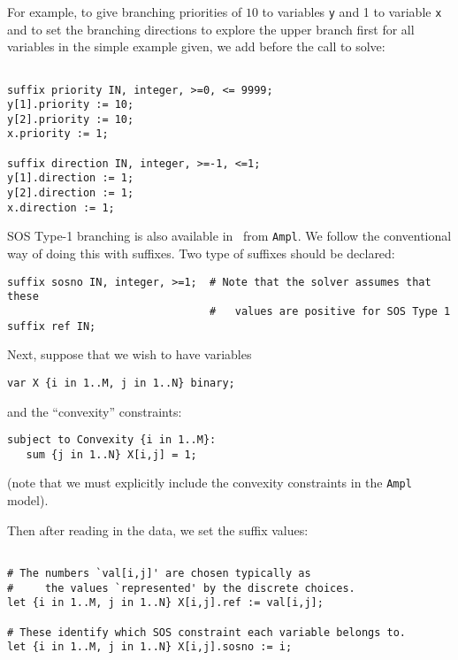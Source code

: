 For example, to give branching priorities of $10$ to variables {\tt y} and 1 to variable {\tt x}
and to set the branching directions to explore the upper branch first for all variables
in the simple example given, we add before the call to solve:
\begin{colorverb}
\begin{verbatim}

suffix priority IN, integer, >=0, <= 9999;
y[1].priority := 10;
y[2].priority := 10;
x.priority := 1;

suffix direction IN, integer, >=-1, <=1;
y[1].direction := 1;
y[2].direction := 1;
x.direction := 1;

\end{verbatim}
\end{colorverb}

SOS Type-1 branching is also available in \Bonmin\ from {\tt Ampl}. We
follow the conventional way of doing this with suffixes.
Two type of suffixes should be declared:

\begin{colorverb}
\begin{verbatim}
suffix sosno IN, integer, >=1;  # Note that the solver assumes that these
                                #   values are positive for SOS Type 1
suffix ref IN;
\end{verbatim}
\end{colorverb}

Next, suppose that we wish to have variables

\begin{colorverb}
\begin{verbatim}
var X {i in 1..M, j in 1..N} binary;
\end{verbatim}
\end{colorverb}
and the ``convexity'' constraints:

\begin{colorverb}
\begin{verbatim}
subject to Convexity {i in 1..M}:
   sum {j in 1..N} X[i,j] = 1;
\end{verbatim}
\end{colorverb}

(note that we must explicitly include the convexity constraints in the {\tt Ampl} model).

Then after reading in the data, we set the suffix values:
\begin{colorverb}
\begin{verbatim}

# The numbers `val[i,j]' are chosen typically as
#     the values `represented' by the discrete choices.
let {i in 1..M, j in 1..N} X[i,j].ref := val[i,j];

# These identify which SOS constraint each variable belongs to.
let {i in 1..M, j in 1..N} X[i,j].sosno := i;
\end{verbatim}
\end{colorverb}

